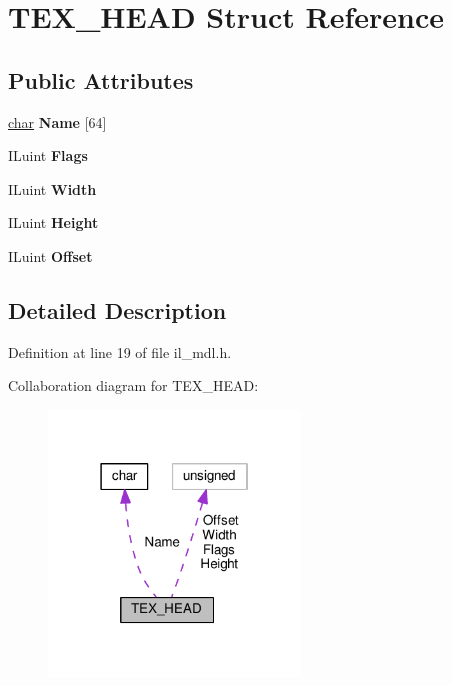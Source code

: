 \hypertarget{structTEX__HEAD}{}\section{T\+E\+X\+\_\+\+H\+E\+AD Struct Reference}
\label{structTEX__HEAD}
\subsection*{Public Attributes}
\begin{DoxyCompactItemize}
\item 
\mbox{\label{structTEX__HEAD_a7d4bedd2a2b8b49875df288a66b1b0d1}} 
\hyperlink{classchar}{char} {\bfseries Name} \mbox{[}64\mbox{]}
\item 
\mbox{\label{structTEX__HEAD_a4ac5e140683e3ca56a3fa0264af440c7}} 
I\+Luint {\bfseries Flags}
\item 
\mbox{\label{structTEX__HEAD_a7889271dd79caccfd8df320ebe765be2}} 
I\+Luint {\bfseries Width}
\item 
\mbox{\label{structTEX__HEAD_a2d312635a9bbb44d2af3934f9a1d25d6}} 
I\+Luint {\bfseries Height}
\item 
\mbox{\label{structTEX__HEAD_a069c4d60bbe51585563c904752ef1f92}} 
I\+Luint {\bfseries Offset}
\end{DoxyCompactItemize}


\subsection{Detailed Description}


Definition at line 19 of file il\+\_\+mdl.\+h.



Collaboration diagram for T\+E\+X\+\_\+\+H\+E\+AD\+:
\nopagebreak
\begin{figure}[H]
\begin{center}
\leavevmode
\includegraphics[width=190pt]{df/dd4/structTEX__HEAD__coll__graph}
\end{center}
\end{figure}


